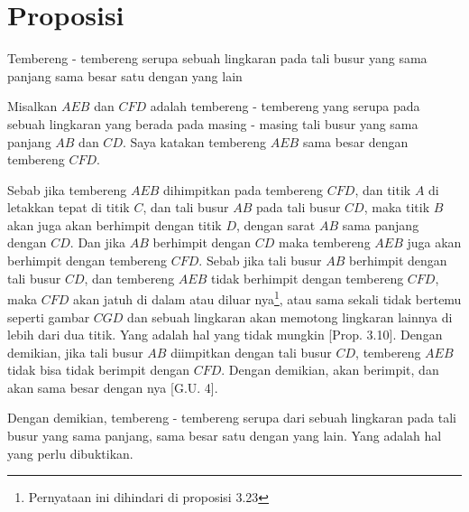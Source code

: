 \documentclass[a4paper]{book}
\begin{document}
\section*{\centering Proposisi \thesection}
Tembereng - tembereng serupa sebuah lingkaran pada tali busur yang
sama panjang sama besar satu dengan yang lain
\begin{center}
\end{center}
Misalkan $AEB$ dan $CFD$ adalah tembereng - tembereng yang serupa pada sebuah
lingkaran yang berada pada masing - masing tali busur yang sama panjang $AB$ 
dan $CD$. Saya katakan tembereng $AEB$ sama besar dengan tembereng $CFD$.

Sebab jika tembereng $AEB$ dihimpitkan pada tembereng $CFD$, dan titik $A$ di
letakkan tepat di titik $C$, dan tali busur $AB$ pada tali busur $CD$, maka 
titik $B$ akan juga akan berhimpit dengan titik $D$, dengan sarat $AB$ sama
panjang dengan $CD$. Dan jika $AB$ berhimpit dengan $CD$ maka tembereng $AEB$
juga akan berhimpit dengan tembereng $CFD$. Sebab jika tali busur $AB$ 
berhimpit dengan tali busur $CD$, dan tembereng $AEB$ tidak berhimpit dengan 
tembereng $CFD$, maka $CFD$ akan jatuh di dalam atau diluar nya\footnote{Pernyataan ini dihindari di proposisi 3.23}, atau sama sekali tidak bertemu seperti
gambar $CGD$ dan sebuah lingkaran akan memotong lingkaran lainnya di lebih
dari dua titik. Yang adalah hal yang tidak mungkin [Prop. 3.10]. Dengan 
demikian, jika tali busur $AB$ diimpitkan dengan tali busur $CD$, tembereng
$AEB$ tidak bisa tidak berimpit dengan $CFD$. Dengan demikian, akan berimpit,
dan akan sama besar dengan nya [G.U. 4].

Dengan demikian, tembereng - tembereng serupa dari sebuah lingkaran pada tali
busur yang sama panjang, sama besar satu dengan yang lain. Yang adalah hal
yang perlu dibuktikan.

\end{document}
